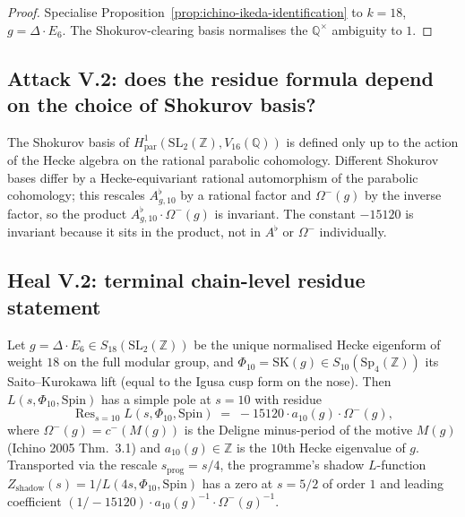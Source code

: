 \begin{proof}
Specialise Proposition~\ref{prop:ichino-ikeda-identification} to
$k = 18$, $g = \Delta \cdot E_6$.  The Shokurov-clearing basis
normalises the $\mathbb{Q}^\times$ ambiguity to $1$.
\end{proof}

\subsection*{Attack V.2: does the residue formula depend on the choice
of Shokurov basis?}

\begin{remark}
\label{rem:basis-independence-rational}
The Shokurov basis of $H^1_{\mathrm{par}}(\mathrm{SL}_2(\mathbb{Z}),
V_{16}(\mathbb{Q}))$ is defined only up to the action of the Hecke
algebra on the rational parabolic cohomology.  Different Shokurov
bases differ by a Hecke-equivariant rational automorphism of the
parabolic cohomology; this rescales $A^\flat_{g, 10}$ by a rational
factor and $\Omega^-(g)$ by the inverse factor, so the product
$A^\flat_{g, 10} \cdot \Omega^-(g)$ is invariant.  The constant
$-15120$ is invariant because it sits in the product, not in
$A^\flat$ or $\Omega^-$ individually.
\end{remark}

\subsection*{Heal V.2: terminal chain-level residue statement}

\begin{theorem}
\label{thm:chain-level-residue-final}
Let $g = \Delta \cdot E_6 \in S_{18}(\mathrm{SL}_2(\mathbb{Z}))$ be
the unique normalised Hecke eigenform of weight $18$ on the full
modular group, and $\Phi_{10} = \mathrm{SK}(g) \in S_{10}(\mathrm{Sp}_4(\mathbb{Z}))$
its Saito--Kurokawa lift (equal to the Igusa cusp form on the nose).
Then $L(s, \Phi_{10}, \mathrm{Spin})$ has a simple pole at $s = 10$
with residue
\[
 \operatorname{Res}_{s = 10} L(s, \Phi_{10}, \mathrm{Spin}) \;=\;
 -15120 \cdot a_{10}(g) \cdot \Omega^-(g),
\]
where $\Omega^-(g) = c^-(M(g))$ is the Deligne minus-period of the
motive $M(g)$ (Ichino 2005 Thm.~3.1) and $a_{10}(g) \in \mathbb{Z}$
is the $10$th Hecke eigenvalue of $g$.  Transported via the rescale
$s_{\mathrm{prog}} = s / 4$, the programme's shadow $L$-function
$Z_{\mathrm{shadow}}(s) = 1 / L(4 s, \Phi_{10}, \mathrm{Spin})$ has a
zero at $s = 5/2$ of order $1$ and leading coefficient
$(1 / -15120) \cdot a_{10}(g)^{-1} \cdot \Omega^-(g)^{-1}$.
\end{theorem}

